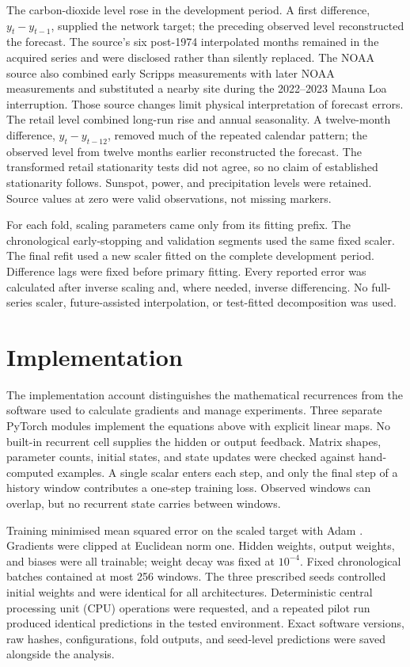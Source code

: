\documentclass[conference,10pt]{IEEEtran}
\begin{document}


The carbon-dioxide level rose in the development period. A first difference, $y_t-y_{t-1}$, supplied the network target; the preceding observed level reconstructed the forecast. The source's six post-1974 interpolated months remained in the acquired series and were disclosed rather than silently replaced. The NOAA source also combined early Scripps measurements with later NOAA measurements and substituted a nearby site during the 2022--2023 Mauna Loa interruption. Those source changes limit physical interpretation of forecast errors. The retail level combined long-run rise and annual seasonality. A twelve-month difference, $y_t-y_{t-12}$, removed much of the repeated calendar pattern; the observed level from twelve months earlier reconstructed the forecast. The transformed retail stationarity tests did not agree, so no claim of established stationarity follows. Sunspot, power, and precipitation levels were retained. Source values at zero were valid observations, not missing markers.

For each fold, scaling parameters came only from its fitting prefix. The chronological early-stopping and validation segments used the same fixed scaler. The final refit used a new scaler fitted on the complete development period. Difference lags were fixed before primary fitting. Every reported error was calculated after inverse scaling and, where needed, inverse differencing. No full-series scaler, future-assisted interpolation, or test-fitted decomposition was used.

\section{Implementation}
The implementation account distinguishes the mathematical recurrences from the software used to calculate gradients and manage experiments. Three separate PyTorch modules implement the equations above with explicit linear maps. No built-in recurrent cell supplies the hidden or output feedback. Matrix shapes, parameter counts, initial states, and state updates were checked against hand-computed examples. A single scalar enters each step, and only the final step of a history window contributes a one-step training loss. Observed windows can overlap, but no recurrent state carries between windows.

Training minimised mean squared error on the scaled target with Adam \cite{kingma2015adam}. Gradients were clipped at Euclidean norm one. Hidden weights, output weights, and biases were all trainable; weight decay was fixed at $10^{-4}$. Fixed chronological batches contained at most 256 windows. The three prescribed seeds controlled initial weights and were identical for all architectures. Deterministic central processing unit (CPU) operations were requested, and a repeated pilot run produced identical predictions in the tested environment. Exact software versions, raw hashes, configurations, fold outputs, and seed-level predictions were saved alongside the analysis.
\end{document}
